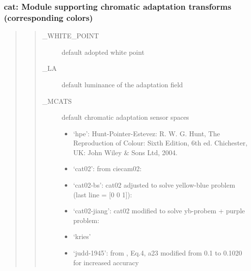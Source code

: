 \documentclass[letterpaper,10pt,english]{sphinxmanual}
\begin{document}
\subsubsection{cat: Module supporting chromatic adaptation transforms (corresponding colors)}
\label{\detokenize{color:cat-module-supporting-chromatic-adaptation-transforms-corresponding-colors}}\begin{quote}
\begin{quote}\begin{description}
\item[{\_WHITE\_POINT}] \leavevmode
default adopted white point

\item[{\_LA}] \leavevmode
default luminance of the adaptation field

\item[{\_MCATS}] \leavevmode
default chromatic adaptation sensor spaces
\begin{itemize}
\item {} 
‘hpe’: Hunt-Pointer-Estevez: R. W. G. Hunt, The Reproduction of Colour: Sixth Edition, 6th ed. Chichester, UK: John Wiley \& Sons Ltd, 2004.

\item {} 
‘cat02’: from ciecam02: 

\item {} 
‘cat02-bs’:  cat02 adjusted to solve yellow-blue problem (last line = {[}0 0 1{]}): 

\item {} 
‘cat02-jiang’: cat02 modified to solve yb-probem + purple problem: 

\item {} 
‘kries’

\item {} 
‘judd-1945’: from , Eq.4, a23 modified from 0.1 to 0.1020 for increased accuracy


\end{itemize}
\end{description}
\end{quote}
\end{quote}
\end{document}
